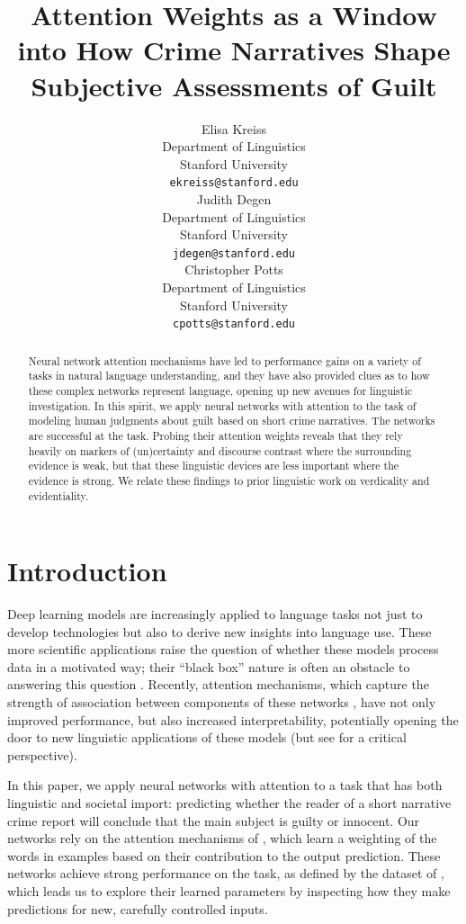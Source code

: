 \documentclass[11pt,a4paper]{article}
\title{Attention Weights as a Window into How Crime Narratives Shape Subjective Assessments of Guilt}
\author{Elisa Kreiss \\
  Department of Linguistics \\
  Stanford University \\
  \texttt{ekreiss@stanford.edu} \\\And
  Judith Degen \\
  Department of Linguistics \\
  Stanford University \\
  \texttt{jdegen@stanford.edu} \\\And
  Christopher Potts \\
  Department of Linguistics \\
  Stanford University \\
  \texttt{cpotts@stanford.edu}\\}
\date{}
\begin{document}
\maketitle
\begin{abstract}
  Neural network attention mechanisms have led to performance gains on a variety of tasks in natural language understanding, and they have also provided clues as to how these complex networks represent language, opening up new avenues for linguistic investigation. In this spirit, we apply neural networks with attention to the task of modeling human judgments about guilt based on short crime narratives. The networks are successful at the task. Probing their attention weights reveals that they rely heavily on markers of (un)certainty and discourse contrast where the surrounding evidence is weak, but that these linguistic devices are less important where the evidence is strong. We relate these findings to prior linguistic work on verdicality and evidentiality.
\end{abstract}

\section{Introduction}

Deep learning models are increasingly applied to language tasks not just to develop technologies but also to derive new insights into language use. These more scientific applications raise the question of whether these models process data in a motivated way; their ``black box'' nature is often an obstacle to answering this question \citep{Alishah-etal:2019}. Recently, attention mechanisms, which capture the strength of association between components of these networks \citep{bahdanau2014neural,luong-etal-2015-effective}, have not only improved performance, but also increased interpretability, potentially opening the door to new linguistic applications of these models (but see \citealt{Serrano:2019} for a critical perspective).

In this paper, we apply neural networks with attention to a task that has both linguistic and societal import: predicting whether the reader of a short narrative crime report will conclude that the main subject is guilty or innocent. Our networks rely on the attention mechanisms of \citet{Lin:2017}, which learn a weighting of the words in examples based on their contribution to the output prediction. These networks achieve strong performance on the task, as defined by the dataset of \citet{Kreiss:2019}, which leads us to explore their learned parameters by inspecting how they make predictions for new, carefully controlled inputs.
\end{document}
